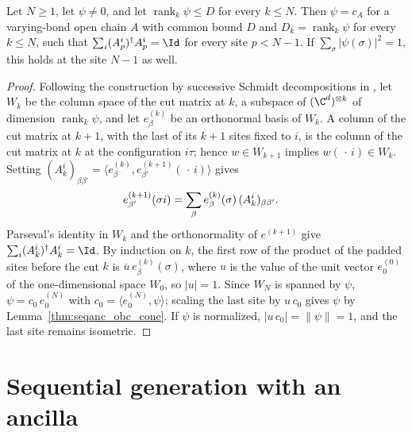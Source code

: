 \begin{lemma}
    \label{thm:seqanc_cut_rank_attained}
    \leanok
    Let $N\ge 1$, let $\psi\ne 0$, and let $\operatorname{rank}_k\psi\le D$ for
    every $k\le N$. Then $\psi=c_A$ for a varying-bond open chain $A$ with
    common bound $D$ and $D_k=\operatorname{rank}_k\psi$ for every $k\le N$,
    such that $\sum_i(A_p^i)^\dagger A_p^i=\Id$ for every site $p<N-1$. If
    $\sum_\sigma|\psi(\sigma)|^2=1$, this holds at the site $N-1$ as
    well.
\end{lemma}
\begin{proof}
    \leanok
    Following the construction by successive Schmidt decompositions in
    \cite[Section~3.1]{PerezGarcia2007Matrix}, let $W_k$ be the column space
    of the cut matrix at $k$, a subspace of $(\C^d)^{\otimes k}$ of dimension
    $\operatorname{rank}_k\psi$, and let $e^{(k)}_\beta$ be an orthonormal
    basis of $W_k$. A column of the cut matrix at $k+1$, with the last of its
    $k+1$ sites fixed to $i$, is the column of the cut matrix at $k$ at the
    configuration $i\tau$; hence $w\in W_{k+1}$ implies
    $w(\,\cdot\,i)\in W_k$. Setting
    $(A_k^i)_{\beta\beta'}=\langle e^{(k)}_\beta,e^{(k+1)}_{\beta'}(\,\cdot\,i)\rangle$
    gives
    \begin{align}
        e^{(k+1)}_{\beta'}(\sigma i)
         & =\sum_\beta e^{(k)}_\beta(\sigma)\,(A_k^i)_{\beta\beta'}.
        \notag
    \end{align}
    Parseval's identity in $W_k$ and the orthonormality of $e^{(k+1)}$ give
    $\sum_i(A_k^i)^\dagger A_k^i=\Id$. By induction on $k$, the first row of
    the product of the padded sites before the cut $k$ is
    $\overline{u}\,e^{(k)}_\beta(\sigma)$, where $u$ is the value of the unit
    vector $e^{(0)}_0$ of the one-dimensional space $W_0$, so $|u|=1$. Since
    $W_N$ is spanned by $\psi$, $\psi=c_0\,e^{(N)}_0$ with
    $c_0=\langle e^{(N)}_0,\psi\rangle$; scaling the last site by $u\,c_0$
    gives $\psi$ by Lemma~\ref{thm:seqanc_obc_cone}. If $\psi$ is
    normalized, $|u\,c_0|=\|\psi\|=1$, and the last site remains isometric.
\end{proof}

\section{Sequential generation with an ancilla}

